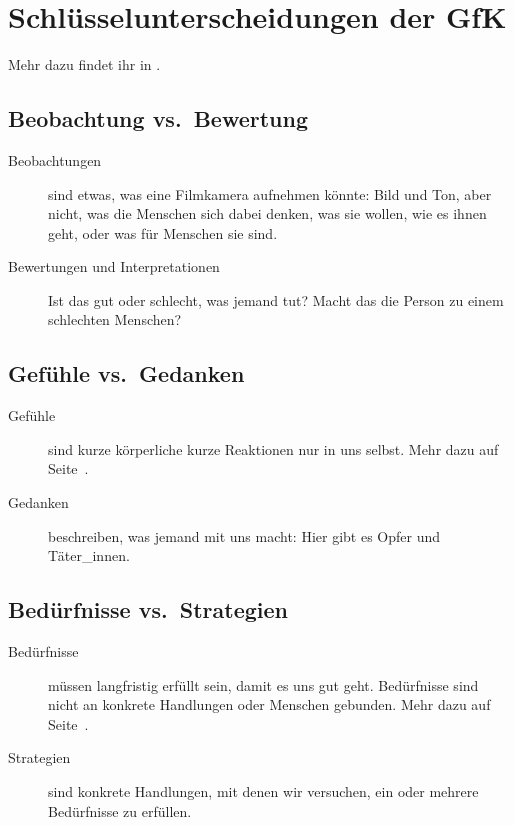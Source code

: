 \section{Schlüsselunterscheidungen der GfK}
\label{gfk-schluesselunterscheidungen}

Mehr dazu findet ihr in \cite[S. 35ff]{gfk-dummies}.

\subsection{Beobachtung vs.~Bewertung}

\begin{description}
 \item[Beobachtungen] sind etwas, was eine Filmkamera aufnehmen könnte: Bild und Ton, aber nicht, was die Menschen sich dabei denken, was sie wollen, wie es ihnen geht, oder was für Menschen sie sind.
 \item[Bewertungen und Interpretationen] Ist das gut oder schlecht, was jemand tut? Macht das die Person zu einem schlechten Menschen?
\end{description}


\subsection{Gefühle vs.~Gedanken}

\begin{description}
 \item[Gefühle] sind kurze körperliche kurze Reaktionen nur in uns selbst. Mehr dazu auf Seite~\pageref{gefuehle}.
 \item[Gedanken] beschreiben, was jemand mit uns macht: Hier gibt es Opfer und Täter\_innen.
\end{description}


\subsection{Bedürfnisse vs.~Strategien}

\begin{description}
 \item[Bedürfnisse] müssen langfristig erfüllt sein, damit es uns gut geht. Bedürfnisse sind nicht an konkrete Handlungen oder Menschen gebunden. Mehr dazu auf Seite~\pageref{beduerfnisse}.
 \item[Strategien] sind konkrete Handlungen, mit denen wir versuchen, ein oder mehrere Bedürfnisse zu erfüllen.
\end{description}
